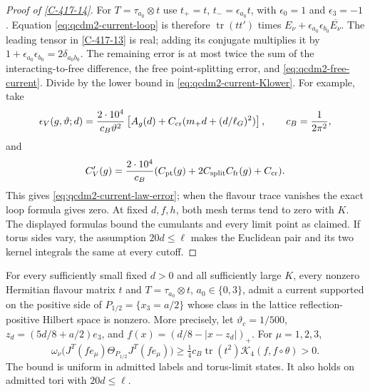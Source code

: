 \documentclass[11pt,letterpaper,reqno]{amsart}
\makeatletter
\theoremstyle{definition}
\newcommand{\ms@minorstart}{%
  \pushQED{\qed}\renewcommand{\qedsymbol}{$\blacksquare$}}
\newenvironment{proposition}[1][]{\ms@minorstart\ms@proposition[#1]}
  {\popQED\endms@proposition}
\theoremstyle{remark}
\makeatother
\begin{document}
\begin{proof}[Proof of \cref{C-417-14}]
For $T=\tau_{a_0}\otimes t$ use $t_+=t$,
$t_-=\epsilon_{a_0}t$, with $\epsilon_0=1$ and
$\epsilon_3=-1$.  Equation \eqref{eq:qcdm2-current-loop}
is therefore $\operatorname{tr}(tt')$ times
$E_\nu+\epsilon_{a_0}\epsilon_{b_0}\overline{E_\nu}$.
The leading tensor in \cref{C-417-13} is real; adding
its conjugate multiplies it by
$1+\epsilon_{a_0}\epsilon_{b_0}=2\delta_{a_0b_0}$.
The remaining error is at most twice the sum of the
interacting-to-free difference, the free point-splitting
error, and \eqref{eq:qcdm2-free-current}.
Divide by the lower bound in
\eqref{eq:qcdm2-current-Klower}.  For example, take
\[
 \epsilon_V(g,\vartheta;d)
 =\frac{2\cdot10^4}{c_B\vartheta^2}
       \left[A_g(d)+C_{\rm cr}
          ({m_+}d+(d/\ell_G)^2)\right],
 \qquad c_B=\frac1{2\pi^2},
\]
and
\[
 C_V'(g)=\frac{2\cdot10^4}{c_B}
       (C_{\rm pt}(g)+2C_{\rm split}C_{\rm fr}(g)+C_{\rm cr}).
\]
This gives \eqref{eq:qcdm2-current-law-error}; when the
flavour trace vanishes the exact loop formula gives zero.
At fixed $d,f,h$, both mesh terms tend to zero with $K$.
The displayed formulas bound the cumulants and every
limit point as claimed.  If torus sides vary, the
assumption $20d\le\ell$ makes the Euclidean pair and
its two kernel integrals the same at every cutoff.
\end{proof}

\begin{proposition}[A nonzero current class]\label{prop:qcdm2-nonzero-current}
For every sufficiently small fixed $d>0$ and all sufficiently
large $K$, every nonzero Hermitian flavour matrix $t$ and
$T=\tau_{a_0}\otimes t$, $a_0\in\{0,3\}$, admit a current
supported on the positive side of
$P_{1/2}=\{x_3=a/2\}$ whose class in the lattice
reflection-positive Hilbert space is nonzero.
More precisely, let $\vartheta_c=1/500$,
$z_d=(5d/8+a/2)e_3$, and
$f(x)=(d/8-|x-z_d|)_+$.  For $\mu=1,2,3$,
\begin{equation}\label{eq:qcdm2-current-norm}
 \omega_\nu\bigl(J^T(fe_\mu)\Theta_{P_{1/2}}J^T(fe_\mu)\bigr)
       \ge\tfrac14c_B\operatorname{tr}(t^2)
                  \mathcal K_4(f,f\circ\theta)>0.
\end{equation}
The bound is uniform in admitted labels and torus-limit
states.  It also holds on admitted tori with $20d\le\ell$.
\end{proposition}
\end{document}
